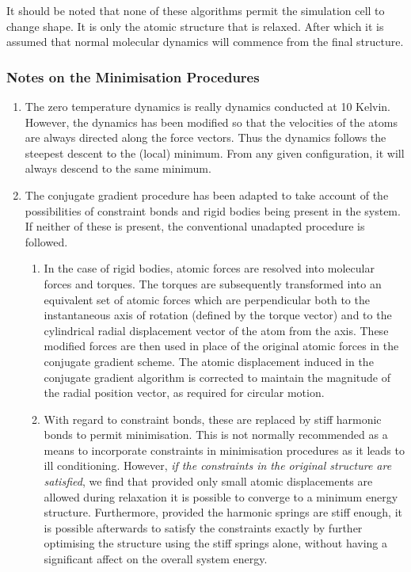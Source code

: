 It should be noted that none of these algorithms permit the simulation
cell to change shape.  It is only the atomic structure that is relaxed.
After which it is assumed that normal molecular dynamics will commence
from the final structure.

\subsubsection*{Notes on the Minimisation Procedures}

\begin{enumerate}
\item The zero temperature dynamics is really dynamics conducted at 10
Kelvin.  However, the dynamics has been modified so that the velocities
of the atoms are always directed along the force vectors.  Thus the
dynamics follows the steepest descent to the (local) minimum.  From any
given configuration, it will always descend to the same minimum.

\item The conjugate gradient procedure has been adapted to take account
of the possibilities of constraint bonds and rigid bodies being present
in the system.  If neither of these is present, the conventional
unadapted procedure is followed.

\begin{enumerate}
\item In the case of rigid bodies, atomic forces are resolved into
molecular forces and torques.  The torques are subsequently transformed
into an equivalent set of atomic forces which are perpendicular both to
the instantaneous axis of rotation (defined by the torque vector) and
to the cylindrical radial displacement vector of the atom from the axis.
These modified forces are then used in place of the original atomic
forces in the conjugate gradient scheme.  The atomic displacement
induced in the conjugate gradient algorithm is corrected to maintain the
magnitude of the radial position vector, as required for circular motion.

\item With regard to constraint bonds, these are replaced by stiff
harmonic bonds to permit minimisation.  This is not normally recommended
as a means to incorporate constraints in minimisation procedures as it
leads to ill conditioning. However, {\it if the constraints in the
original structure are satisfied}, we find that provided only small
atomic displacements are allowed during relaxation it is possible to
converge to a minimum energy structure. Furthermore, provided the
harmonic springs are stiff enough, it is possible afterwards to satisfy
the constraints exactly by further optimising the structure using the
stiff springs alone, without having a significant affect on the overall
system energy.


\end{enumerate}
\end{enumerate}
